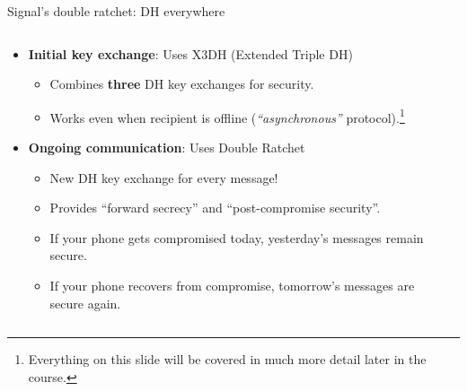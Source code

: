 \documentclass[aspectratio=169, lualatex, handout]{beamer}
\begin{document}
\begin{frame}{Signal's double ratchet: DH everywhere}
	\begin{columns}[c]
		\begin{column}{0.7\textwidth}
			\begin{itemize}[<+->]
				\item \textbf{Initial key exchange}: Uses X3DH (Extended Triple DH)
				      \begin{itemize}
					      \item Combines \textbf{three} DH key exchanges for security.
					      \item Works even when recipient is offline (\textit{``asynchronous''} protocol).\footnote{Everything on this slide will be covered in much more detail later in the course.}
				      \end{itemize}
				\item \textbf{Ongoing communication}: Uses Double Ratchet
				      \begin{itemize}
					      \item New DH key exchange for every message!
					      \item Provides ``forward secrecy'' and ``post-compromise security''.
					      \item If your phone gets compromised today, yesterday's messages remain secure.
					      \item If your phone recovers from compromise, tomorrow's messages are secure again.
				      \end{itemize}
			\end{itemize}
		\end{column}
		\begin{column}{0.3\textwidth}
		\end{column}
	\end{columns}
\end{frame}
\end{document}
